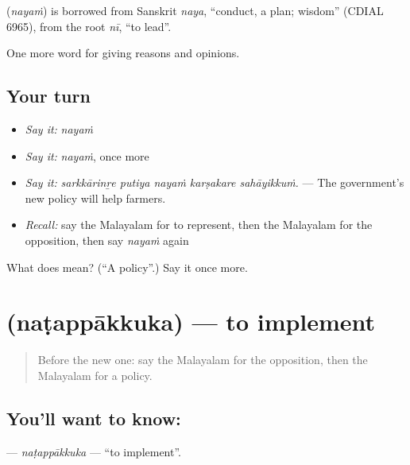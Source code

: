 \begin{cousinweb}
\textbf{} (\emph{nayaṁ}) is borrowed from Sanskrit \emph{naya}, \textquotedblleft{}conduct, a plan; wisdom\textquotedblright{} (CDIAL 6965), from the root \emph{nī}, \textquotedblleft{}to lead\textquotedblright{}.
\end{cousinweb}

\begin{grammarlens}[title={What you've built}]
One more word for giving reasons and opinions.
\end{grammarlens}

\subsection*{Your turn}
\begin{itemize}
\raggedright
  \item \emph{Say it:} \emph{nayaṁ}
  \item \emph{Say it:} \emph{nayaṁ}, once more
  \item \emph{Say it:} \emph{sarkkārinṟe putiya nayaṁ karṣakare sahāyikkuṁ.} — The government's new policy will help farmers.
  \item \emph{Recall:} say the Malayalam for to represent, then the Malayalam for the opposition, then say \emph{nayaṁ} again
\end{itemize}

\begin{tcolorbox}[breakable,colback=teal!4,colframe=teal!35!black,title={Before you move on}]
What does  mean? (\textquotedblleft{}A policy\textquotedblright{}.) Say it once more.
\end{tcolorbox}
\section[\texorpdfstring{\ml{നടപ്പാക്കുക} (naṭappākkuka)}{നടപ്പാക്കുക (naṭappākkuka)}]{ (naṭappākkuka) — to implement}

\label{lesson:ML-C423-natappakkuka}



\begin{quote}
Before the new one: say the Malayalam for the opposition, then the Malayalam for a policy.
\end{quote}

\subsection*{You'll want to know: }
\textbf{} — \emph{naṭappākkuka} — \textquotedblleft{}to implement\textquotedblright{}.

